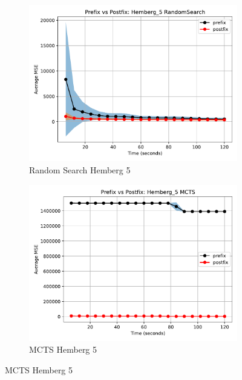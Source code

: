 \documentclass[runningheads]{llncs}
\begin{document}
\begin{figure}
    \centering
    
    \begin{subfigure}[b]{0.4\textwidth}
        \includegraphics[width=\linewidth, keepaspectratio]{Hemberg_Benchmarks/PrePostHemberg_5RandomSearch.pdf}
        \caption{Random Search Hemberg 5}
        \label{subfig:hemberg_5_RS}
    \end{subfigure}
    \begin{subfigure}[b]{0.4\textwidth}
        \includegraphics[width=\linewidth, keepaspectratio]{Hemberg_Benchmarks/PrePostHemberg_5MCTS.pdf}
        \caption{MCTS Hemberg 5}
        \label{subfig:hemberg_5_MCTS}
    \end{subfigure}
    

\end{figure}
\end{document}
